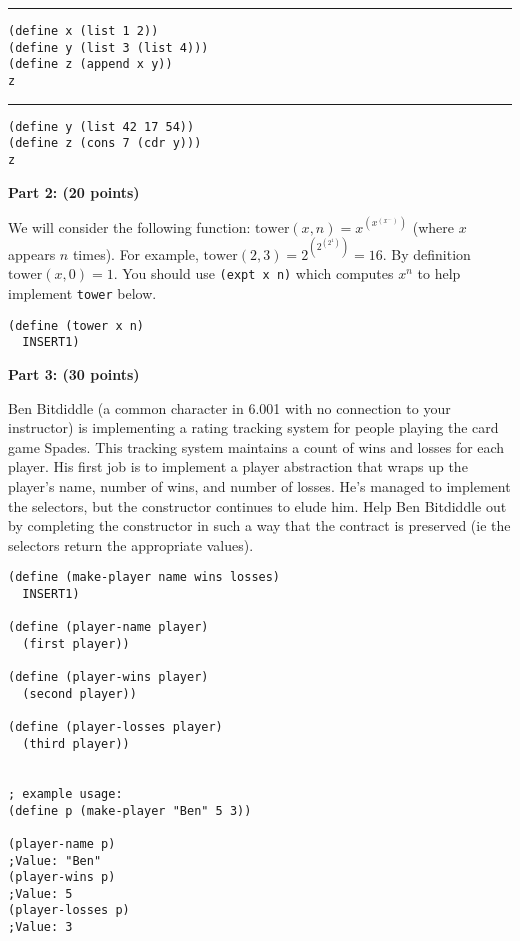 \rule{4in}{.5pt}
\medskip
{\small \begin{verbatim}
(define x (list 1 2))
(define y (list 3 (list 4)))
(define z (append x y))
z
\end{verbatim}}
\vspace*{-0.1in}

\rule{4in}{.5pt}
\medskip
{\small \begin{verbatim}
(define y (list 42 17 54))
(define z (cons 7 (cdr y)))
z
\end{verbatim}}
\vspace*{-0.1in}


\newpage
{\bf Part 2: (20 points)}

We will consider the following function:
$\mathrm{tower}(x,n)=x^{(x^{(x^{...})})}$ (where $x$ appears $n$ times).
For example, $\mathrm{tower}(2,3)=2^{(2^{(2^{1})})}=16$.  By definition
$\mathrm{tower}(x,0)=1$.  You should use {\tt (expt x n)} which
computes $x^n$ to help implement {\tt tower} below.

\begin{verbatim}
(define (tower x n)
  INSERT1)
\end{verbatim}



\newpage
{\bf Part 3: (30 points)}

Ben Bitdiddle (a common character in 6.001 with no connection to your
instructor) is implementing a rating tracking system for people
playing the card game Spades.  This tracking system maintains a count
of wins and losses for each player.  His first job is to implement a
player abstraction that wraps up the player's name, number of wins,
and number of losses.  He's managed to implement the selectors, but
the constructor continues to elude him.  Help Ben Bitdiddle out by
completing the constructor in such a way that the contract is
preserved (ie the selectors return the appropriate values).

\begin{verbatim}
(define (make-player name wins losses)
  INSERT1)

(define (player-name player)
  (first player))

(define (player-wins player)
  (second player))

(define (player-losses player)
  (third player))


; example usage:
(define p (make-player "Ben" 5 3))

(player-name p)
;Value: "Ben"
(player-wins p)
;Value: 5
(player-losses p)
;Value: 3
\end{verbatim}

